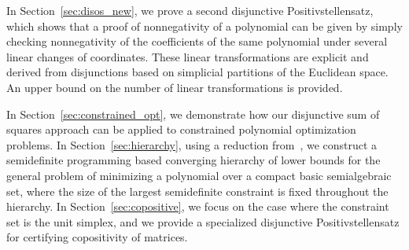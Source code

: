 \documentclass[12pt]{article}
\theoremstyle{remark}
\begin{document}






In Section~\ref{sec:disos_new}, we prove a second disjunctive Positivstellensatz, which shows that a proof of nonnegativity of a polynomial can be given by simply checking nonnegativity of the coefficients of the same polynomial under several linear changes of coordinates. These linear transformations are explicit and derived from disjunctions based on simplicial partitions of the Euclidean space. An upper bound on the number of linear transformations is provided.





In Section~\ref{sec:constrained_opt}, we demonstrate how our disjunctive sum of squares approach can be applied to constrained polynomial optimization problems. 
In Section~\ref{sec:hierarchy}, 
using a reduction from~\cite{aaa2019}, we construct a semidefinite programming based converging hierarchy of lower bounds for the general problem of minimizing a polynomial over a compact basic semialgebraic set, where the size of the largest semidefinite constraint is fixed throughout the hierarchy.
In Section~\ref{sec:copositive}, 
we focus on the case where the constraint set is the unit simplex, and we provide a specialized disjunctive Positivstellensatz for certifying copositivity of matrices.
\end{document}

